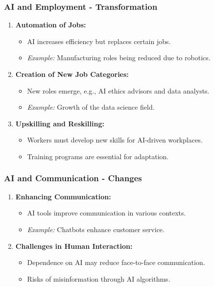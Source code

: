 \documentclass[aspectratio=169]{beamer}
\begin{document}
\begin{frame}[fragile]
    \frametitle{AI and Employment - Transformation}
    \begin{enumerate}
        \item \textbf{Automation of Jobs:}
            \begin{itemize}
                \item AI increases efficiency but replaces certain jobs.
                \item \textit{Example:} Manufacturing roles being reduced due to robotics.
            \end{itemize}

        \item \textbf{Creation of New Job Categories:}
            \begin{itemize}
                \item New roles emerge, e.g., AI ethics advisors and data analysts.
                \item \textit{Example:} Growth of the data science field.
            \end{itemize}

        \item \textbf{Upskilling and Reskilling:}
            \begin{itemize}
                \item Workers must develop new skills for AI-driven workplaces.
                \item Training programs are essential for adaptation.
            \end{itemize}
    \end{enumerate}
\end{frame}

\begin{frame}[fragile]
    \frametitle{AI and Communication - Changes}
    \begin{enumerate}
        \item \textbf{Enhancing Communication:}
            \begin{itemize}
                \item AI tools improve communication in various contexts.
                \item \textit{Example:} Chatbots enhance customer service.
            \end{itemize}

        \item \textbf{Challenges in Human Interaction:}
            \begin{itemize}
                \item Dependence on AI may reduce face-to-face communication.
                \item Risks of misinformation through AI algorithms.
            \end{itemize}
    \end{enumerate}
\end{frame}
\end{document}
